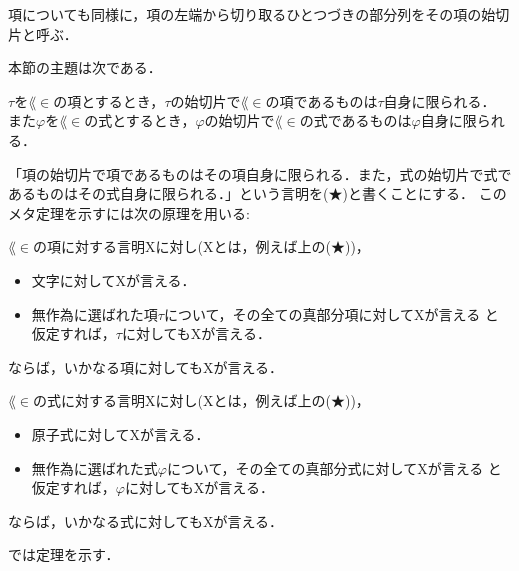 	項についても同様に，項の左端から切り取るひとつづきの部分列をその項の始切片と呼ぶ．
	
	本節の主題は次である．
	\begin{screen}
		\begin{metathm}[始切片の一意性]\label{metathm:initial_segment_L_in}
			$\tau$を$\lang{\in}$の項とするとき，$\tau$の始切片で$\lang{\in}$の項であるものは$\tau$自身に限られる．
			また$\varphi$を$\lang{\in}$の式とするとき，$\varphi$の始切片で$\lang{\in}$の式であるものは$\varphi$自身に限られる．
		\end{metathm}
	\end{screen}
	
	「項の始切片で項であるものはその項自身に限られる．また，式の始切片で式であるものはその式自身に限られる．」という言明を(★)と書くことにする．
	このメタ定理を示すには次の原理を用いる:
	
	\begin{screen}
		\begin{metaaxm}
			$\lang{\in}$の項に対する言明Xに対し(Xとは，例えば上の(★))，
			\begin{itemize}
				\item 文字に対してXが言える．
				\item 無作為に選ばれた項$\tau$について，その全ての真部分項に対してXが言える
					と仮定すれば，$\tau$に対してもXが言える．
			\end{itemize}
			ならば，いかなる項に対してもXが言える．
		\end{metaaxm}
	\end{screen}
	
	\begin{screen}
		\begin{metaaxm}
			$\lang{\in}$の式に対する言明Xに対し(Xとは，例えば上の(★))，
			\begin{itemize}
				\item 原子式に対してXが言える．
				\item 無作為に選ばれた式$\varphi$について，その全ての真部分式に対してXが言える
					と仮定すれば，$\varphi$に対してもXが言える．
			\end{itemize}
			ならば，いかなる式に対してもXが言える．
		\end{metaaxm}
	\end{screen}
	
	では定理を示す．
	
